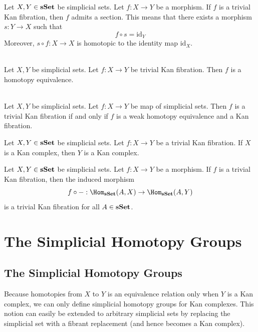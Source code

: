 \documentclass[a4paper]{article}
\begin{document}
\begin{crl}{}{} Let $X,Y\in\bold{sSet}$ be simplicial sets. Let $f:X\to Y$ be a morphism. If $f$ is a trivial Kan fibration, then $f$ admits a section. This means that there exists a morphism $s:Y\to X$ such that $$f\circ s=\text{id}_Y$$ Moreover, $s\circ f:X\to X$ is homotopic to the identity map $\text{id}_X$. 
\end{crl}

\begin{crl}{}{}\\
Let $X,Y$ be simplicial sets. Let $f:X\to Y$ be trivial Kan fibration. Then $f$ is a homotopy equivalence. 
\end{crl}

\begin{prp}{}{}\\
Let $X,Y$ be simplicial sets. Let $f:X\to Y$ be map of simplicial sets. Then $f$ is a trivial Kan fibration if and only if $f$ is a weak homotopy equivalence and a Kan fibration. 
\end{prp}

\begin{prp}{}{} Let $X,Y\in\bold{sSet}$ be simplicial sets. Let $f:X\to Y$ be a trivial Kan fibration. If $X$ is a Kan complex, then $Y$ is a Kan complex. 
\end{prp}

\begin{prp}{}{} Let $X,Y\in\bold{sSet}$ be simplicial sets. Let $f:X\to Y$ be a morphism. If $f$ is a trivial Kan fibration, then the induced morphism $$f\circ -:\Hom_\bold{sSet}(A,X)\to\Hom_\bold{sSet}(A,Y)$$ is a trivial Kan fibration for all $A\in\bold{sSet}$. 
\end{prp}

\pagebreak
\section{The Simplicial Homotopy Groups}
\subsection{The Simplicial Homotopy Groups}
Because homotopies from $X$ to $Y$ is an equivalence relation only when $Y$ is a Kan complex, we can only define simplicial homotopy groups for Kan complexes. This notion can easily be extended to arbitrary simplicial sets by replacing the simplicial set with a fibrant replacement (and hence becomes a Kan complex). 
\end{document}
